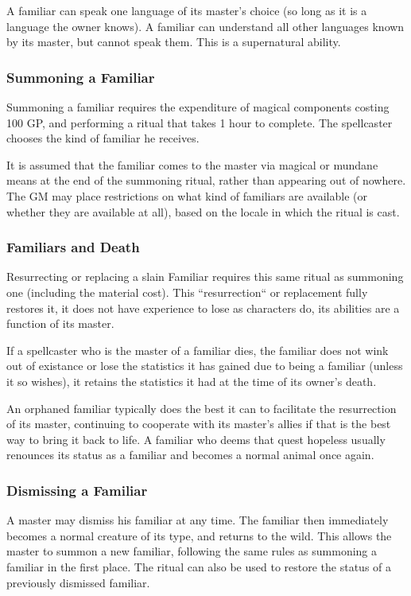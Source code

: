 A familiar can speak one language of its master's choice (so long as it is a language the owner knows). 
A familiar can understand all other languages known by its master, but cannot speak them. This is a supernatural ability. 
\subsubsection{Summoning a Familiar}
Summoning a familiar requires the expenditure of magical components costing 100 GP, 
and performing a ritual that takes 1 hour to complete.
The spellcaster chooses the kind of familiar he receives.

It is assumed that the familiar comes to the master via magical or mundane means at the end of the summoning ritual, 
rather than appearing out of nowhere.
The GM may place restrictions on what kind of familiars are available (or whether they are available at all), 
based on the locale in which the ritual is cast.
\subsubsection{Familiars and Death}
Resurrecting or replacing a slain Familiar requires this same ritual as summoning one (including the material cost).
This ``resurrection`` or replacement fully restores it, it does not have experience to lose as characters do, its abilities are a function of its master.

If a spellcaster who is the master of a familiar dies, the familiar does not wink out of existance or lose the statistics it has gained due to being a familiar (unless it so wishes), 
it retains the statistics it had at the time of its owner's death.

An orphaned familiar typically does the best it can to facilitate the resurrection of its master, continuing to cooperate with its master's allies if that is the best way to bring it back to life.
A familiar who deems that quest hopeless usually renounces its status as a familiar and becomes a normal animal once again.
\subsubsection{Dismissing a Familiar}
A master may dismiss his familiar at any time. The familiar then immediately becomes a normal creature of its type, and returns to the wild.
This allows the master to summon a new familiar, following the same rules as summoning a familiar in the first place.
The ritual can also be used to restore the status of a previously dismissed familiar.

